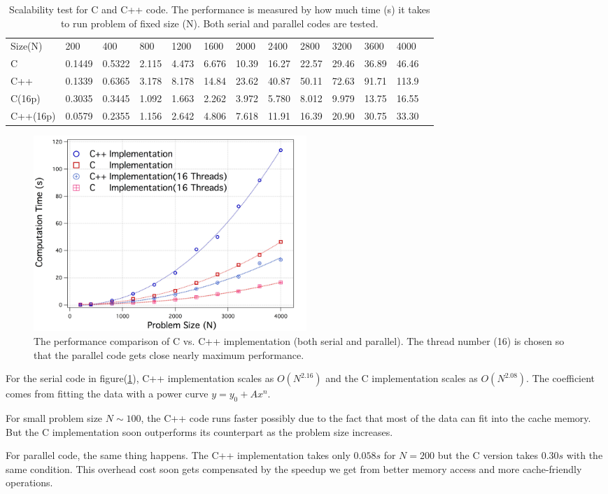 \documentclass[a4paper,11pt]{article}
\begin{document}
	\begin{table}[H]
	\centering
	\label{my-label}
	\begin{tabular}{lllllllllllll}
	Size(N)  & 200    & 400    & 800   & 1200  & 1600  & 2000  & 2400  & 2800  & 3200  & 3600  & 4000  \\ \cline{1-12}
	C        & 0.1449 & 0.5322 & 2.115 & 4.473 & 6.676 & 10.39 & 16.27 & 22.57 & 29.46 & 36.89 & 46.46 \\ 
	C++      & 0.1339 & 0.6365 & 3.178 & 8.178 & 14.84 & 23.62 & 40.87 & 50.11 & 72.63 & 91.71 & 113.9 \\
	C(16p)   & 0.3035 & 0.3445 & 1.092 & 1.663 & 2.262 & 3.972 & 5.780 & 8.012 & 9.979 & 13.75 & 16.55 \\
	C++(16p) & 0.0579 & 0.2355 & 1.156 & 2.642 & 4.806 & 7.618 & 11.91 & 16.39 & 20.90 & 30.75 & 33.30 \\
	\end{tabular}
	\caption{Scalability test for C and C++ code. The performance is measured by how much time (s) it takes to run problem of fixed size (N). Both serial and parallel codes are tested.}
	\end{table}
	
	\begin{figure}[H]
        \centering
                \includegraphics[width=0.5\textwidth]{performance.jpg}
                \caption {The performance comparison of C vs. C++ implementation (both serial and parallel). The thread number (16) is chosen so that the parallel code gets close nearly maximum performance.}
                \label{performance}
	\end{figure}
	For the serial code in figure(\ref{performance}), C++ implementation scales as $O(N^{2.16})$ and the C implementation scales as $O(N^{2.08})$. The coefficient comes from fitting the data with a power curve $y = y_0+Ax^{n}$. 
	\par For small problem size $N\sim100$, the C++ code runs faster possibly due to the fact that most of the data can fit into the cache memory. But the C implementation soon outperforms its counterpart as the problem size increases.
	\par For parallel code, the same thing happens. The C++ implementation takes only $0.058s$ for $N=200$ but the C version takes $0.30 s$ with the same condition. This overhead cost soon gets compensated by the speedup we get from better memory access and more cache-friendly operations.
\end{document}
